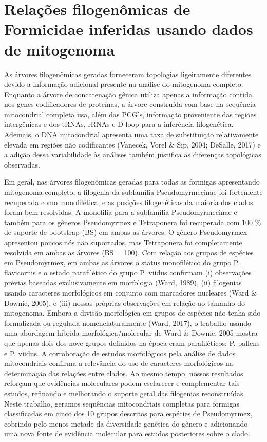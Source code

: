 \documentclass[../DISSERTACAO_MAIN.tex]{subfiles}
\begin{document}
	
	
	\section{Relações filogenômicas de Formicidae inferidas usando dados de mitogenoma}
	
	As árvores filogenômicas geradas forneceram topologias ligeiramente diferentes devido a informação adicional presente na análise do mitogenoma completo. Enquanto a árvore de concatenação gênica utiliza apenas a informação contida nos genes codificadores de proteínas, a árvore construída com base na sequência mitocondrial completa usa, além das PCG’s, informação proveniente das regiões intergênicas e dos tRNAs, rRNAs e D-loop para a inferência filogenética. Ademais, o DNA mitocondrial apresenta uma taxa de substituição relativamente elevada em regiões não codificantes (Vanecek, Vorel \& Sip, 2004; DeSalle, 2017) e a adição dessa variabilidade às análises também justifica as diferenças topológicas observadas.
	
	Em geral, nas árvores filogenômicas geradas para todas as formigas apresentando mitogenoma completo, a filogenia da subfamília Pseudomyrmecinae foi fortemente recuperada como monofilética, e as posições filogenéticas da maioria dos clados foram bem resolvidas. A monofilia para a subfamília Pseudomyrmecinae e também para os gêneros Pseudomyrmex e Tetraponera foi recuperada com 100 \% de suporte de bootstrap (BS) em ambas as árvores. O gênero Pseudomyrmex apresentou poucos nós não suportados, mas Tetraponera foi completamente resolvida em ambas as árvores (BS = 100). Com relação aos grupos de espécies em Pseudomyrmex, em ambas as árvores o status monofilético do grupo P. flavicornis e o estado parafilético do grupo P. viidus confirmam (i) observações prévias baseadas exclusivamente em morfologia (Ward, 1989), (ii) filogenias usando caracteres morfológicos em conjunto com marcadores nucleares (Ward \& Downie, 2005), e (iii) nossas próprias observações em relação ao tamanho do mitogenoma. Embora a divisão morfológica em grupos de espécies não tenha sido formalizada ou regulada nomenclaturalmente (Ward, 2017), o trabalho usando uma abordagem híbrida morfológica/molecular de Ward \& Downie, 2005 mostra que apenas dois dos nove grupos definidos na época eram parafiléticos: P. pallens e P. viidus. A corroboração de estudos morfológicos pela análise de dados mitocondriais confirma a relevância do uso de caracteres morfológicos na determinação das relações entre clados. Ao mesmo tempo, nossos resultados reforçam que evidências moleculares podem esclarecer e complementar tais estudos, refinando e melhorando o suporte geral das filogenias reconstruídas. Neste trabalho, geramos sequências mitocondriais completas para formigas classificadas em cinco dos 10 grupos descritos para espécies de Pseudomyrmex, cobrindo pelo menos metade da diversidade genética do gênero e adicionando uma nova fonte de evidência molecular para estudos posteriores sobre o clado.
	
\end{document}
